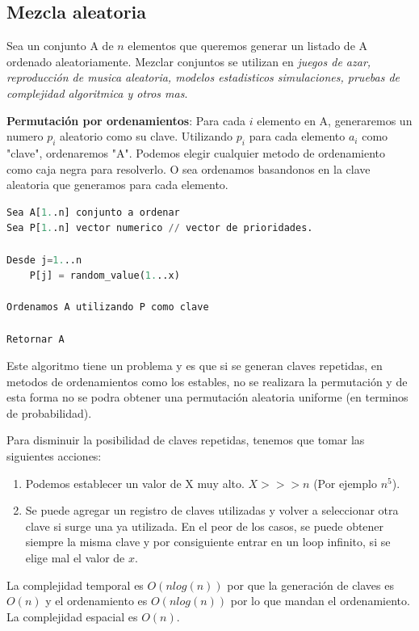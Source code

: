 \documentclass{article}
\begin{document}
\newpage
\subsection{Mezcla aleatoria}

Sea un conjunto A de \(n\) elementos que queremos generar un listado de A ordenado aleatoriamente.
Mezclar conjuntos se utilizan en \textit{juegos de azar, reproducción de musica aleatoria, modelos estadisticos 
simulaciones, pruebas de complejidad algoritmica y otros mas}.

\textbf{Permutación por ordenamientos}: 
Para cada \(i\) elemento en A, generaremos un numero \(p_i\) aleatorio como su clave.
Utilizando \(p_i\) para cada elemento \(a_i\) como "clave", ordenaremos "A". Podemos elegir 
cualquier metodo de ordenamiento como caja negra para resolverlo. O sea ordenamos basandonos
en la clave aleatoria que generamos para cada elemento.


\begin{lstlisting}[language=Python, caption=Algoritmo de permutación por odenamiento]
Sea A[1..n] conjunto a ordenar
Sea P[1..n] vector numerico // vector de prioridades.

Desde j=1...n
    P[j] = random_value(1...x)

Ordenamos A utilizando P como clave

Retornar A
\end{lstlisting}

Este algoritmo tiene un problema y es que si se generan claves repetidas, en metodos de 
ordenamientos como los estables, no se realizara la permutación y de esta forma no se podra 
obtener una permutación aleatoria uniforme (en terminos de probabilidad). 

Para disminuir la posibilidad de claves repetidas, tenemos que tomar las siguientes acciones:

\begin{enumerate}
    \item Podemos establecer un valor de X muy alto. \(X >>> n \) (Por ejemplo \(n^5\)).
    \item Se puede agregar un registro de claves utilizadas y volver a seleccionar otra clave 
            si surge una ya utilizada. En el peor de los casos, se puede obtener siempre la misma
            clave y por consiguiente entrar en un loop infinito, si se elige mal el valor de \(x\).
\end{enumerate}

La complejidad temporal es \(O(n log(n))\) por que la generación de claves es \(O(n)\) y el ordenamiento
es \(O(n log(n))\) por lo que mandan el ordenamiento. La complejidad espacial es \(O(n)\).
\end{document}
